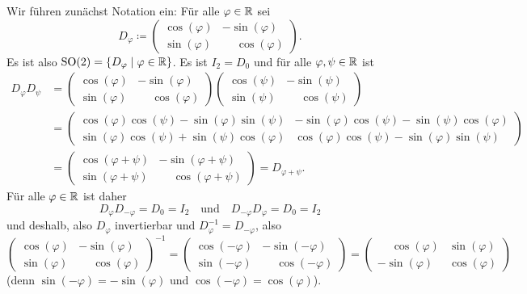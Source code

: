 Wir führen zunächst Notation ein: Für alle $\varphi \in \mathbb{R}$ sei
\[
 D_\varphi \coloneqq
 \begin{pmatrix}
  \cos(\varphi) &           -\sin(\varphi) \\
  \sin(\varphi) & \phantom{-}\cos(\varphi)
 \end{pmatrix}.
\]
Es ist also $\mathrm{SO}(2) = \{D_\varphi \mid \varphi \in \mathbb{R}\}$. Es ist $I_2 = D_0$ und für alle $\varphi, \psi \in \mathbb{R}$ ist
\begin{align*}
 D_\varphi D_\psi
 &=
 \begin{pmatrix}
  \cos(\varphi) &           -\sin(\varphi) \\
  \sin(\varphi) & \phantom{-}\cos(\varphi)
 \end{pmatrix}
 \begin{pmatrix}
  \cos(\psi) & -\sin(\psi) \\
  \sin(\psi) & \phantom{-}\cos(\psi)
 \end{pmatrix} \\
 &=
 \begin{pmatrix}
  \cos(\varphi)\cos(\psi)-\sin(\varphi)\sin(\psi) &
  -\sin(\varphi)\cos(\psi)-\sin(\psi)\cos(\varphi) \\
  \sin(\varphi)\cos(\psi)+\sin(\psi)\cos(\varphi) &
  \cos(\varphi)\cos(\psi)-\sin(\varphi)\sin(\psi)
 \end{pmatrix} \\
 &=
 \begin{pmatrix}
  \cos(\varphi+\psi) &           -\sin(\varphi+\psi) \\
  \sin(\varphi+\psi) & \phantom{-}\cos(\varphi+\psi)
 \end{pmatrix}
 =
 D_{\varphi+\psi}.
\end{align*}
Für alle $\varphi \in \mathbb{R}$ ist daher
\[
 D_{\varphi} D_{-\varphi} = D_0 = I_2
 \quad\text{und}\quad
 D_{-\varphi} D_{\varphi} = D_0 = I_2
\]
und deshalb, also $D_{\varphi}$ invertierbar und $D_{\varphi}^{-1} = D_{-\varphi}$, also
\[
 \begin{pmatrix}
  \cos(\varphi) &           -\sin(\varphi) \\
  \sin(\varphi) & \phantom{-}\cos(\varphi)
 \end{pmatrix}^{-1}
 =
 \begin{pmatrix}
  \cos(-\varphi) &           -\sin(-\varphi) \\
  \sin(-\varphi) & \phantom{-}\cos(-\varphi)
 \end{pmatrix}
 =
 \begin{pmatrix}
  \phantom{-}\cos(\varphi) & \sin(\varphi) \\
            -\sin(\varphi) & \cos(\varphi)
 \end{pmatrix}
\]
(denn $\sin(-\varphi) = -\sin(\varphi)$ und $\cos(-\varphi) = \cos(\varphi)$).


